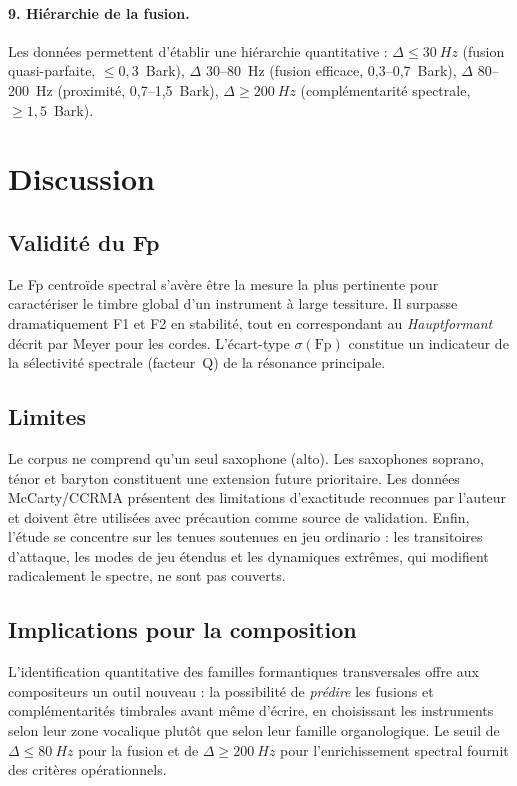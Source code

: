 \documentclass[11pt,a4paper]{article}
\begin{document}
\paragraph{9. Hiérarchie de la fusion.}
Les données permettent d'établir une hiérarchie quantitative :
$\Delta \leq \SI{30}{Hz}$ (fusion quasi-parfaite, $\leq 0{,}3$~Bark),
$\Delta$ 30--\SI{80}{Hz} (fusion efficace, 0,3--0,7~Bark),
$\Delta$ 80--\SI{200}{Hz} (proximité, 0,7--1,5~Bark),
$\Delta \geq \SI{200}{Hz}$ (complémentarité spectrale, $\geq
1{,}5$~Bark).


\section{Discussion}

\subsection{Validité du Fp}

Le Fp centroïde spectral s'avère être la mesure la plus pertinente pour
caractériser le timbre global d'un instrument à large tessiture. Il
surpasse dramatiquement F1 et F2 en stabilité, tout en correspondant au
\emph{Hauptformant} décrit par Meyer pour les cordes. L'écart-type
$\sigma(\mathrm{Fp})$ constitue un indicateur de la sélectivité
spectrale (facteur~Q) de la résonance principale.

\subsection{Limites}

Le corpus ne comprend qu'un seul saxophone (alto). Les saxophones
soprano, ténor et baryton constituent une extension future prioritaire.
Les données McCarty/CCRMA présentent des limitations d'exactitude
reconnues par l'auteur et doivent être utilisées avec précaution comme
source de validation. Enfin, l'étude se concentre sur les tenues
soutenues en jeu ordinario : les transitoires d'attaque, les modes de
jeu étendus et les dynamiques extrêmes, qui modifient radicalement le
spectre, ne sont pas couverts.

\subsection{Implications pour la composition}

L'identification quantitative des familles formantiques transversales
offre aux compositeurs un outil nouveau : la possibilité de
\emph{prédire} les fusions et complémentarités timbrales avant même
d'écrire, en choisissant les instruments selon leur zone vocalique
plutôt que selon leur famille organologique. Le seuil de $\Delta \leq
\SI{80}{Hz}$ pour la fusion et de $\Delta \geq \SI{200}{Hz}$ pour
l'enrichissement spectral fournit des critères opérationnels.
\end{document}
